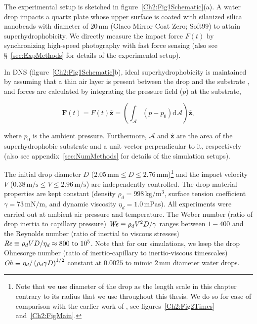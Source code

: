 The experimental setup is sketched in figure~\ref{Ch2:Fig1Schematic}(a). A water drop impacts a quartz plate whose upper surface is coated with silanized silica nanobeads with diameter of $20\,\si{\nano\meter}$ (Glaco Mirror Coat Zero; Soft99) \cite{li2017, gauthier2015}  to attain superhydrophobicity. We directly measure the  impact force $F(t)$ by synchronizing high-speed photography with fast force sensing (also see \S~\ref{sec:ExpMethods} for details of the experimental setup). 

In DNS (figure~\ref{Ch2:Fig1Schematic}b), ideal superhydrophobicity is maintained by assuming that a thin air layer is present between the drop and the substrate \cite[][also see chapters~\ref{chap:DropViscousBouncing}, and~\ref{chap:DropOnDrop}]{ramirez2020lifting}, and forces are calculated by integrating the pressure field ($p$) at the substrate,

\begin{equation}
	\label{Ch2:Eqn::force2}
	\boldsymbol{F}(t) = F(t) \boldsymbol{\hat{z}} = \left(\int_\mathcal{A} \left(p-p_0\right)\mathrm{d}\mathcal{A}\right)\boldsymbol{\hat{z}},
\end{equation}

\noindent where $p_0$ is the ambient pressure. Furthermore, $\mathcal{A}$ and $\boldsymbol{\hat{z}}$ are the area of the superhydrophobic substrate and a unit vector perpendicular to it, respectively (also see appendix~\ref{sec:NumMethods} for details of the simulation setups). 

The initial drop diameter $D$ ($2.05\,\si{\milli\meter} \le D \le 2.76\,\si{\milli\meter}$)\footnote{Note that we use diameter of the drop as the length scale in this chapter contrary to its radius that we use throughout this thesis. We do so for ease of comparison with the earlier work of \citet{Gordillo2018}, see figures~\ref{Ch2:Fig2Times} and~\ref{Ch2:FigMain}.} and the impact velocity $V$ ($0.38\,\si{\meter}/\si{\second} \le V \le 2.96\,\si{\meter}/\si{\second}$) are independently controlled. The drop material properties are kept constant (density $\rho_d = 998\,\si{\kilogram}/\si{\meter}^{3}$, surface tension coefficient $\gamma = 73\,\si{\milli\newton}/\si{\meter}$, and dynamic viscosity $\eta_d = 1.0\,\si{\milli\pascal}\si{\second}$). All experiments were carried out at ambient air pressure and temperature. The Weber number (ratio of drop inertia to capillary pressure) $\mathit{We} \equiv \rho_d V^2 D / \gamma$ ranges between $1 - 400$ and the Reynolds number (ratio of inertial to viscous stresses) $\mathit{Re} \equiv \rho_d V D / \eta_d \approx 800\,\,\text{to}\,\,10^5$.  Note that for our simulations, we keep the drop Ohnesorge number (ratio of inertio-capillary to inertio-viscous timescales) $\mathit{Oh} \equiv \eta_d/\left(\rho_d\gamma D\right)^{1/2}$ constant at $0.0025$ to mimic $2\,\si{\milli\meter}$ diameter water drops. 

